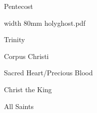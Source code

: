 \beginpart Pentecost


\bigskip

\pdfximage width 80mm {holyghost.pdf}

\centerline{\pdfrefximage \pdflastximage}



\bigskip

\eject


\paginaproxima

\beginpart Trinity



\paginaproxima

\beginpart Corpus Christi


\bigskip



\paginaproxima


\bigskip



\bigskip

\eject


\paginaproxima

\beginpart Sacred Heart/Precious Blood



\bigskip



\bigskip



\eject

\beginpart Christ the King


\bigskip



%

\bigskip


\eject

\beginpart All Saints


